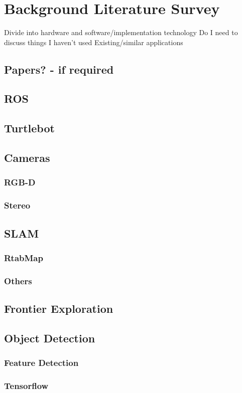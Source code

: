 \documentclass{mproj}
\begin{document}
\chapter{Background Literature Survey}\label{survey}
Divide into hardware and software/implementation technology
Do I need to discuss things I haven't used
Existing/similar applications
\section{Papers? - if required}
\section{ROS}
\section{Turtlebot}
\section{Cameras}
\subsection{RGB-D}
\subsection{Stereo}
\section{SLAM}
\subsection{RtabMap}
\subsection{Others}
\section{Frontier Exploration}
\section{Object Detection}
\subsection{Feature Detection}
\subsection{Tensorflow}
\end{document}
